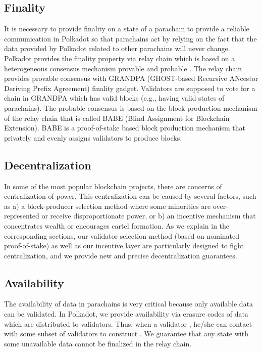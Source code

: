  \subsection{Finality}

 It is necessary to provide finality on a state of a parachain  to provide a reliable communication in Polkadot so that parachains act by relying on the fact that the data provided by Polkadot related to other parachains will never change.  Polkadot provides the finality property via relay chain which is based on a heterogeneous consensus mechanism  provable  and probable . The relay chain provides provable consensus with GRANDPA (GHOST-based Recursive ANcestor Deriving Prefix Agreement)  finality gadget. Validators are supposed to vote for a chain in GRANDPA  which has valid blocks (e.g., having valid states of parachains). The probable consensus is based on the block production mechanism of the relay chain that is called BABE (Blind Assignment for Blockchain Extension). BABE is a proof-of-stake based block production mechanism that privately and evenly assigns validators to produce blocks.

\subsection{Decentralization}

In some of the most popular blockchain projects, there are concerns of centralization of power.
This centralization can be caused by several factors, such as
a) a block-producer selection method where some minorities are over-represented or receive disproportionate power, or
b) an incentive mechanism that concentrates wealth or encourages cartel formation.
As we explain in the corresponding sections, our validator selection method (based on nominated proof-of-stake)
as well as our incentive layer are particularly designed to fight centralization,
and we provide new and precise decentralization guarantees.


 \subsection{Availability}
The availability of data in parachains is very critical because only available data can be validated.  In Polkadot, we provide availability via erasure codes of data which are distributed to validators. Thus, when a validator , he/she can contact with some subset of validators to construct . We guarantee that any state with some unavailable data cannot be finalized in the relay chain.



